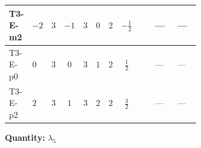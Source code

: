 \documentclass[8pt]{article}
\begin{document}
\begin{landscape}
\begin{longtable}{@{}llcccccc >{\raggedright\arraybackslash}p{0.21\linewidth} >{\raggedright\arraybackslash}p{0.21\linewidth} >{\raggedright\arraybackslash}p{0.21\linewidth}@{}}
\midrule
T3-E-m2 & $-2$ & $3$ & $-1$ & $3$ & $0$ & $2$ & $-\frac{1}{2}$ & \scriptsize\adjustbox{max width=\linewidth}{$\begin{gathered} +4 {\lambda_{HS_2}^{(1)}} {\lambda_5}\end{gathered}$} & --- & --- \\
\midrule
T3-E-p0 & $0$ & $3$ & $0$ & $3$ & $1$ & $2$ & $\frac{1}{2}$ & \scriptsize\adjustbox{max width=\linewidth}{$\begin{gathered} +4 {\lambda_{HS_2}^{(1)}} {\lambda_5}\end{gathered}$} & --- & --- \\
\midrule
T3-E-p2 & $2$ & $3$ & $1$ & $3$ & $2$ & $2$ & $\frac{3}{2}$ & \scriptsize\adjustbox{max width=\linewidth}{$\begin{gathered} +4 {\lambda_{HS_2}^{(1)}} {\lambda_5}\end{gathered}$} & --- & --- \\
\midrule
\bottomrule
\end{longtable}
\clearpage
\noindent\textbf{Quantity: }$\lambda_5$\par\smallskip

\end{landscape}
\end{document}
